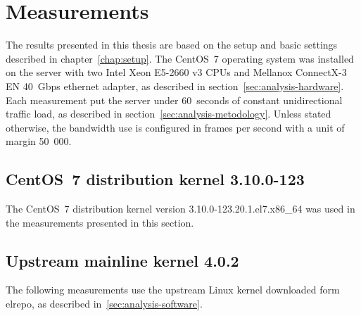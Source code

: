 
\chapter{Measurements}\label{chap:measurements}
The results presented in this thesis are based on the setup and basic settings described in chapter~\ref{chap:setup}.
The CentOS~7 operating system
was installed on the server with two Intel Xeon E5-2660 v3 CPUs
and Mellanox ConnectX-3 EN 40~Gbps ethernet adapter, as described in section~\ref{sec:analysis-hardware}.
Each measurement put the server under 60~seconds of constant unidirectional traffic load,
as described in section~\ref{sec:analysis-metodology}.
Unless stated otherwise,
the bandwidth use is configured in frames per second with a unit of margin 50~000.

\section{CentOS~7 distribution kernel 3.10.0-123}
The CentOS~7 distribution kernel version 3.10.0-123.20.1.el7.x86\_64
was used in the measurements presented in this section.

	
	
	
	
	
	
	
	
	
	
	
	
	
	
	

	

\section{Upstream mainline kernel 4.0.2}
The following measurements use the upstream Linux kernel downloaded form elrepo, as described in~\ref{sec:analysis-software}.

	
	
	

